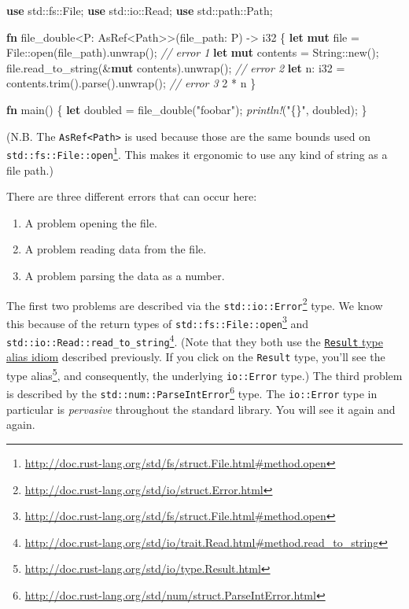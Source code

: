 \documentclass[a4paper,]{book}
\newenvironment{Shaded}{\begin{snugshade}}{\end{snugshade}}
\newcommand{\KeywordTok}[1]{\textcolor[rgb]{0.13,0.29,0.53}{\textbf{{#1}}}}
\newcommand{\DataTypeTok}[1]{\textcolor[rgb]{0.13,0.29,0.53}{{#1}}}
\newcommand{\DecValTok}[1]{\textcolor[rgb]{0.00,0.00,0.81}{{#1}}}
\newcommand{\StringTok}[1]{\textcolor[rgb]{0.31,0.60,0.02}{{#1}}}
\newcommand{\CommentTok}[1]{\textcolor[rgb]{0.56,0.35,0.01}{\textit{{#1}}}}
\newcommand{\PreprocessorTok}[1]{\textcolor[rgb]{0.56,0.35,0.01}{\textit{{#1}}}}
\newcommand{\NormalTok}[1]{{#1}}
\renewcommand{\href}[2]{#2\footnote{\url{#1}}}
\providecommand{\tightlist}{%
  \setlength{\itemsep}{0pt}\setlength{\parskip}{0pt}}
\begin{document}
\begin{Shaded}
\begin{Highlighting}[]
\KeywordTok{use} \NormalTok{std::fs::File;}
\KeywordTok{use} \NormalTok{std::io::Read;}
\KeywordTok{use} \NormalTok{std::path::Path;}

\KeywordTok{fn} \NormalTok{file_double<P: AsRef<Path>>(file_path: P) -> }\DataTypeTok{i32} \NormalTok{\{}
    \KeywordTok{let} \KeywordTok{mut} \NormalTok{file = File::open(file_path).unwrap(); }\CommentTok{// error 1}
    \KeywordTok{let} \KeywordTok{mut} \NormalTok{contents = }\DataTypeTok{String}\NormalTok{::new();}
    \NormalTok{file.read_to_string(&}\KeywordTok{mut} \NormalTok{contents).unwrap(); }\CommentTok{// error 2}
    \KeywordTok{let} \NormalTok{n: }\DataTypeTok{i32} \NormalTok{= contents.trim().parse().unwrap(); }\CommentTok{// error 3}
    \DecValTok{2} \NormalTok{* n}
\NormalTok{\}}

\KeywordTok{fn} \NormalTok{main() \{}
    \KeywordTok{let} \NormalTok{doubled = file_double(}\StringTok{"foobar"}\NormalTok{);}
    \PreprocessorTok{println!}\NormalTok{(}\StringTok{"\{\}"}\NormalTok{, doubled);}
\NormalTok{\}}
\end{Highlighting}
\end{Shaded}

(N.B. The \texttt{AsRef\textless{}Path\textgreater{}} is used because
those are the
\href{http://doc.rust-lang.org/std/fs/struct.File.html\#method.open}{same
bounds used on \texttt{std::fs::File::open}}. This makes it ergonomic to
use any kind of string as a file path.)

There are three different errors that can occur here:

\begin{enumerate}
\def\labelenumi{\arabic{enumi}.}
\tightlist
\item
  A problem opening the file.
\item
  A problem reading data from the file.
\item
  A problem parsing the data as a number.
\end{enumerate}

The first two problems are described via the
\href{http://doc.rust-lang.org/std/io/struct.Error.html}{\texttt{std::io::Error}}
type. We know this because of the return types of
\href{http://doc.rust-lang.org/std/fs/struct.File.html\#method.open}{\texttt{std::fs::File::open}}
and
\href{http://doc.rust-lang.org/std/io/trait.Read.html\#method.read_to_string}{\texttt{std::io::Read::read\_to\_string}}.
(Note that they both use the
\protect\hyperlink{the-result-type-alias-idiom}{\texttt{Result} type
alias idiom} described previously. If you click on the \texttt{Result}
type, you'll \href{http://doc.rust-lang.org/std/io/type.Result.html}{see
the type alias}, and consequently, the underlying \texttt{io::Error}
type.) The third problem is described by the
\href{http://doc.rust-lang.org/std/num/struct.ParseIntError.html}{\texttt{std::num::ParseIntError}}
type. The \texttt{io::Error} type in particular is \emph{pervasive}
throughout the standard library. You will see it again and again.
\end{document}
